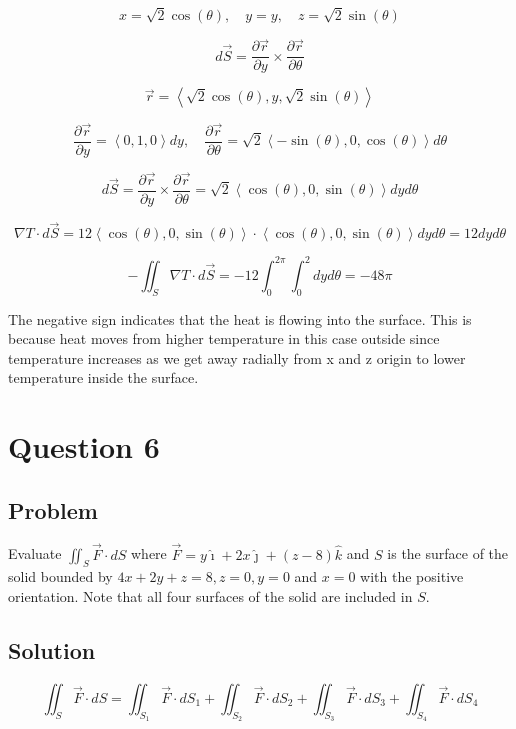 \documentclass[12pt]{article}
\begin{document}
\[
    x = \sqrt{2} \cos(\theta), \quad y = y, \quad z = \sqrt{2} \sin(\theta)
\]

\[
    d\vec{S}
    = \frac{\partial \vec{r}}{\partial y} \times \frac{\partial \vec{r}}{\partial \theta}
\]

\[
    \vec{r} = \left\langle \sqrt{2} \cos(\theta), y, \sqrt{2} \sin(\theta)\right\rangle
\]

\[
    \frac{\partial \vec{r}}{\partial y}
    = \left\langle 0, 1, 0\right\rangle dy, \quad \frac{\partial \vec{r}}{\partial \theta}
    = \sqrt{2} \left\langle -\sin(\theta), 0, \cos(\theta)\right\rangle d\theta
\]

\[
    d\vec{S}
    = \frac{\partial \vec{r}}{\partial y} \times \frac{\partial \vec{r}}{\partial \theta}
    = \sqrt{2} \left\langle \cos(\theta), 0, \sin(\theta)\right\rangle dy d\theta
\]

\[
    \nabla T \cdot d\vec{S}
    = 12 \left\langle \cos(\theta), 0, \sin(\theta)\right\rangle \cdot \left\langle \cos(\theta), 0, \sin(\theta)\right\rangle dy d\theta
    = 12 dy d\theta
\]

\[
    -\iint_S \nabla T \cdot d\vec{S}
    = - 12 \int_{0}^{2\pi} \int_{0}^{2} dy d\theta
    = - 48 \pi
\]

The negative sign indicates that the heat is flowing into the surface. This is because heat moves
from higher temperature in this case outside since temperature increases as we get away radially
from x and z origin to lower temperature inside the surface.

\newpage
\section{Question 6}

\subsection{Problem}

Evaluate \(\iint_S \vec{F} \cdot d S\) where
\(\vec{F} = y \hat{\imath} + 2x \hat{\jmath} + (z - 8) \hat{k}\) and \(S\) is the surface of the
solid bounded by \(4x + 2y + z = 8, z = 0, y = 0\) and \(x = 0\) with the positive orientation.
Note that all four surfaces of the solid are included in \(S\).

\subsection{Solution}

\[
    \iint_S \vec{F} \cdot d S
    = \iint_{S_1} \vec{F} \cdot d S_1
    + \iint_{S_2} \vec{F} \cdot d S_2
    + \iint_{S_3} \vec{F} \cdot d S_3
    + \iint_{S_4} \vec{F} \cdot d S_4
\]
\end{document}
